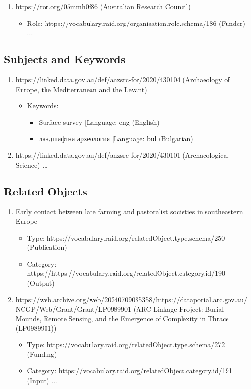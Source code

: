 \begin{framed}
{\begin{enumerate}
\item https://ror.org/05mmh0f86 (Australian Research Council)
   \begin{itemize}
   \item Role: https://vocabulary.raid.org/organisation.role.schema/186 (Funder) ...
   \end{itemize}
\end{enumerate}

\subsection*{Subjects and Keywords}
\begin{enumerate}
\item https://linked.data.gov.au/def/anzsrc-for/2020/430104 (Archaeology of Europe, the Mediterranean and the Levant)
   \begin{itemize}
   \item Keywords:
   \begin{itemize}
   \item Surface survey [Language: eng (English)]
   \item \textrussian{ландшафтна археология} [Language: bul (Bulgarian)]
   \end{itemize}
   \end{itemize}

\item https://linked.data.gov.au/def/anzsrc-for/2020/430101 (Archaeological Science) ...

\end{enumerate}

\subsection*{Related Objects}
\begin{enumerate}
\item Early contact between late farming and pastoralist societies in southeastern Europe
   \begin{itemize}
   \item Type: https://vocabulary.raid.org/relatedObject.type.schema/250 (Publication)
   \item Category: https://https://vocabulary.raid.org/relatedObject.category.id/190 (Output)
   \end{itemize}

\item https://web.archive.org/web/20240709085358/https://dataportal.arc.gov.au/NCGP/Web/Grant/Grant/LP0989901 (ARC Linkage Project: Burial Mounds, Remote Sensing, and the Emergence of Complexity in Thrace (LP0989901))
   \begin{itemize}
   \item Type: https://vocabulary.raid.org/relatedObject.type.schema/272 (Funding)
   \item Category: https://vocabulary.raid.org/relatedObject.category.id/191 (Input) ...
   \end{itemize}
\end{enumerate}

}
\end{framed}
